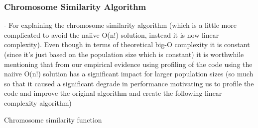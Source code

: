 \documentclass{sig-alternate}
\begin{document}


\subsubsection{Chromosome Similarity Algorithm}

- For explaining the chromosome similarity algorithm (which is a little more
  complicated to avoid the naiive O(n!) solution, instead it is now linear
  complexity). Even though in terms of theoretical big-O complexity it is
  constant (since it's just based on the population size which is constant) it
  is worthwhile mentioning that from our empirical evidence using profiling of
  the code using the naiive O(n!) solution has a significant impact for larger
  population sizes (so much so that it caused a significant degrade in performance
  motivating us to profile the code and improve the original algorithm and create
  the following linear complexity algorithm)\cite{bowman:reasoning}


\begin{algorithm}
  \SetAlgoLined
  \DontPrintSemicolon
  
\caption{Chromosome similarity function}
\end{algorithm}
\end{document}
